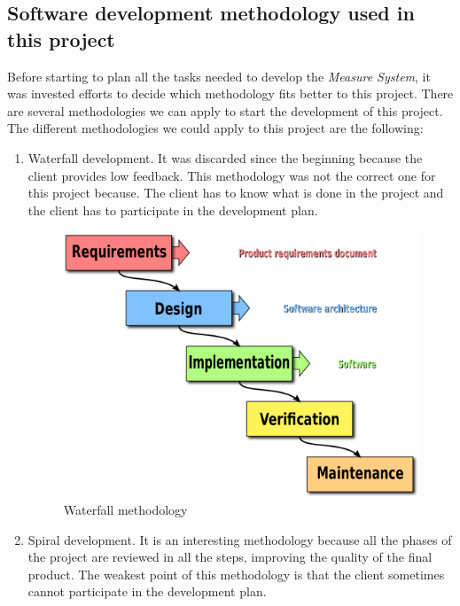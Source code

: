 \subsection{Software development methodology used in this project}

Before starting to plan all the tasks needed to develop the \textit{Measure System}, it was invested efforts to decide which methodology fits better to this project. There are several methodologies we can apply to start the development of this project. The different methodologies we could apply to this project are the following:

\begin{enumerate}

\item Waterfall development. It was discarded since the beginning because the client provides low feedback. This methodology was not the correct one for this project because. The client has to know what is done in the project and the client has to participate in the development plan.

\begin{figure}[H]
\begin{centering}
\includegraphics[scale=0.2]{IMGS/waterfall_methodology.png}
\caption{Waterfall methodology \label{Waterfall methodology}}
\end{centering}
\end{figure} 

\item Spiral development. It is an interesting methodology because all the phases of the project are reviewed in all the steps, improving the quality of the final product. The weakest point of this methodology is that the client sometimes cannot participate in the development plan.


\end{enumerate}
